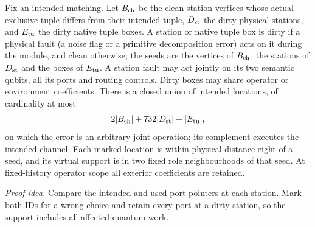 \begin{lemma}\label{f4:dispatch}
Fix an intended matching. Let \(B_{\rm ch}\) be the clean-station
vertices whose actual exclusive tuple differs from their intended
tuple, \(D_{\rm st}\) the dirty physical stations, and \(E_{\rm tu}\)
the dirty native tuple boxes. A station or native tuple box is dirty if
a physical fault (a noise flag or a primitive decomposition error) acts
on it during the module, and clean otherwise; the seeds are the vertices
of \(B_{\rm ch}\), the stations of \(D_{\rm st}\) and the boxes of
\(E_{\rm tu}\). A station fault may act jointly on its
two semantic qubits, all its ports and routing controls. Dirty boxes
may share operator or environment coefficients. There is a closed
union of intended locations, of cardinality at most
\[
 2|B_{\rm ch}|+732|D_{\rm st}|+|E_{\rm tu}|,
\]
on which the error is an arbitrary joint operation; its complement
executes the intended channel. Each marked location is within physical
distance eight of a seed, and its virtual support is in two fixed
role neighbourhoods of that seed. At fixed-history operator scope
all exterior coefficients are retained.
\end{lemma}
\par\noindent\emph{Proof idea.} Compare the intended and used port pointers at each station. Mark both IDs for a wrong choice and retain every port at a dirty station, so the support includes all affected quantum work.

